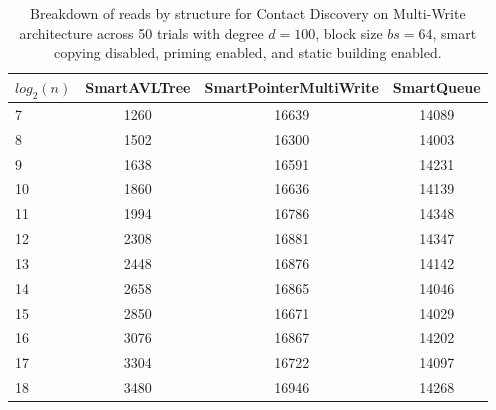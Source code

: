 \begin{table}[]
\centering
\begin{tabular}{|l|c|c|c|}
$log_2(n)$ & SmartAVLTree & SmartPointerMultiWrite & SmartQueue \\ \hline
7 & 1260 & 16639 & 14089 \\ \hline
8 & 1502 & 16300 & 14003 \\ \hline
9 & 1638 & 16591 & 14231 \\ \hline
10 & 1860 & 16636 & 14139 \\ \hline
11 & 1994 & 16786 & 14348 \\ \hline
12 & 2308 & 16881 & 14347 \\ \hline
13 & 2448 & 16876 & 14142 \\ \hline
14 & 2658 & 16865 & 14046 \\ \hline
15 & 2850 & 16671 & 14029 \\ \hline
16 & 3076 & 16867 & 14202 \\ \hline
17 & 3304 & 16722 & 14097 \\ \hline
18 & 3480 & 16946 & 14268 \\ \hline
\end{tabular}
\caption{Breakdown of reads by structure for Contact Discovery on Multi-Write architecture across 50 trials with degree $d=100$, block size $bs=64$, smart copying disabled, priming enabled, and static building enabled.}
    \label{tab:reads_by_structure_cd_d100_bs64_trials50_copiesfalse_primetrue_staticinsertiontrue_ptmultiwrite_movetrue}
\end{table}

